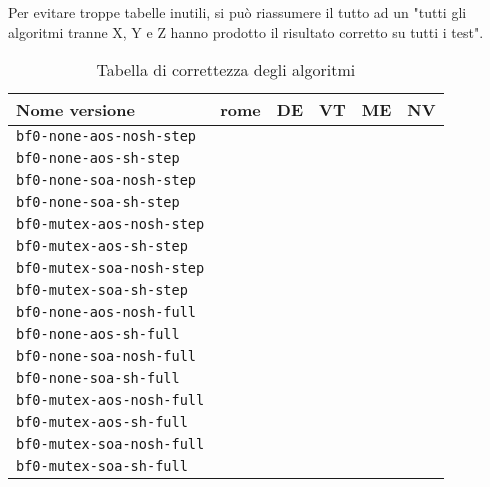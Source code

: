 \documentclass[a4paper]{article}
\begin{document}
	Per evitare troppe tabelle inutili, si può riassumere il tutto ad un "tutti gli algoritmi tranne X, Y e Z hanno prodotto il risultato corretto su tutti i test".
	\begin{table}[!ht]
		\centering
		\begin{tabular}{|l|c|c|c|c|c|}
			\hline
			\textbf{Nome versione} & \textbf{rome} & \textbf{DE} & \textbf{VT} & \textbf{ME} & \textbf{NV} \\ \hline
			\texttt{bf0-none-aos-nosh-step}  &  &  &  &  &  \\ \hline
			\texttt{bf0-none-aos-sh-step}    &  &  &  &  &  \\ \hline
			\texttt{bf0-none-soa-nosh-step}  &  &  &  &  &  \\ \hline
			\texttt{bf0-none-soa-sh-step}    &  &  &  &  &  \\ \hline
			\texttt{bf0-mutex-aos-nosh-step} &  &  &  &  &  \\ \hline
			\texttt{bf0-mutex-aos-sh-step}   &  &  &  &  &  \\ \hline
			\texttt{bf0-mutex-soa-nosh-step} &  &  &  &  &  \\ \hline
			\texttt{bf0-mutex-soa-sh-step}   &  &  &  &  &  \\ \hline
			\texttt{bf0-none-aos-nosh-full}  &  &  &  &  &  \\ \hline
			\texttt{bf0-none-aos-sh-full}    &  &  &  &  &  \\ \hline
			\texttt{bf0-none-soa-nosh-full}  &  &  &  &  &  \\ \hline
			\texttt{bf0-none-soa-sh-full}    &  &  &  &  &  \\ \hline
			\texttt{bf0-mutex-aos-nosh-full} &  &  &  &  &  \\ \hline
			\texttt{bf0-mutex-aos-sh-full}   &  &  &  &  &  \\ \hline
			\texttt{bf0-mutex-soa-nosh-full} &  &  &  &  &  \\ \hline
			\texttt{bf0-mutex-soa-sh-full}   &  &  &  &  &  \\ \hline
		\end{tabular}
		\label{tab:correttezza}
		\caption{Tabella di correttezza degli algoritmi}
	\end{table}
	
\end{document}

